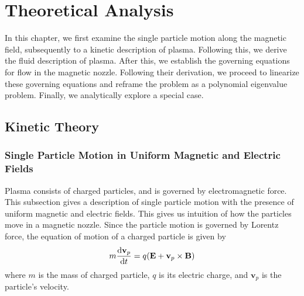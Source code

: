 \chapter{Theoretical Analysis} \label{chap:theoretical-analysis}
In this chapter, we first examine the single particle motion along the magnetic field, subsequently to a kinetic description of plasma. Following this, we derive the fluid description of plasma. After this, we establish the governing equations for flow in the magnetic nozzle. Following their derivation, we proceed to linearize these governing equations and reframe the problem as a polynomial eigenvalue problem. Finally, we analytically explore a special case.

\section{Kinetic Theory}
\subsection{Single Particle Motion in Uniform Magnetic and Electric Fields} \label{sec:single-particle-motion}
Plasma consists of charged particles, and is governed by electromagnetic force. This subsection gives a description of single particle motion with the presence of uniform magnetic and electric fields. This gives us intuition of how the particles move in a magnetic nozzle. Since the particle motion is governed by Lorentz force, the equation of motion of a charged particle is given by
\begin{equation}
	m\dv{\mathbf{v}_p}{t} = q(\mathbf{E} + \mathbf{v}_p\times \mathbf{B})
	\label{eq:equation-of-motion-single-particle}
\end{equation}
where $m$ is the mass of charged particle, $q$ is its electric charge, and $\mathbf{v}_p$ is the particle's velocity.

